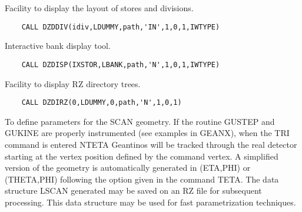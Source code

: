 \ENDCMD


\BEGARG
{}
\ENDARG

   \par
Facility to display the layout of stores and divisions.  
\begin{verbatim}
    CALL DZDDIV(idiv,LDUMMY,path,'IN',1,0,1,IWTYPE)
\end{verbatim}

\ENDCMD


\BEGARG
{}
\ENDARG

   \par
Interactive bank display tool.  
\begin{verbatim}
    CALL DZDISP(IXSTOR,LBANK,path,'N',1,0,1,IWTYPE)
\end{verbatim}

\ENDCMD


\BEGARG
{}
\ENDARG

   \par
Facility to display RZ directory trees.  
\begin{verbatim}
    CALL DZDIRZ(0,LDUMMY,0,path,'N',1,0,1)
\end{verbatim}

\ENDCMD
\newpage
{}
\ifMENUtext
   \par
To define parameters for the SCAN geometry. If the routine GUSTEP and 
   GUKINE are properly instrumented (see examples in GEANX), when the TRI 
   command is entered NTETA Geantinos will be tracked through the real 
   detector starting at the vertex position defined by the command vertex. A 
   simplified version of the geometry is automatically generated in (ETA,PHI) 
   or (THETA,PHI) following the option given in the command TETA. The data 
   structure LSCAN generated may be saved on an RZ file for subsequent 
   processing.  This data structure may be used for fast parametrization 
   techniques.  


\fi


